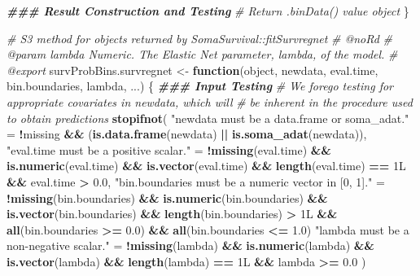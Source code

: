 \documentclass[
]{book}
\newenvironment{Shaded}{\begin{snugshade}}{\end{snugshade}}
\newcommand{\CommentTok}[1]{\textcolor[rgb]{0.56,0.35,0.01}{\textit{#1}}}
\newcommand{\ControlFlowTok}[1]{\textcolor[rgb]{0.13,0.29,0.53}{\textbf{#1}}}
\newcommand{\DocumentationTok}[1]{\textcolor[rgb]{0.56,0.35,0.01}{\textbf{\textit{#1}}}}
\newcommand{\FloatTok}[1]{\textcolor[rgb]{0.00,0.00,0.81}{#1}}
\newcommand{\FunctionTok}[1]{\textcolor[rgb]{0.13,0.29,0.53}{\textbf{#1}}}
\newcommand{\NormalTok}[1]{#1}
\newcommand{\OtherTok}[1]{\textcolor[rgb]{0.56,0.35,0.01}{#1}}
\newcommand{\SpecialCharTok}[1]{\textcolor[rgb]{0.81,0.36,0.00}{\textbf{#1}}}
\newcommand{\StringTok}[1]{\textcolor[rgb]{0.31,0.60,0.02}{#1}}
\begin{document}
\begin{Shaded}
\begin{Highlighting}[]
  \DocumentationTok{\#\#\# Result Construction and Testing}
  \CommentTok{\# Return \textasciigrave{}.binData()\textasciigrave{} value object}
\NormalTok{\}}

\CommentTok{\#\textquotesingle{} S3 method for objects returned by \textasciigrave{}SomaSurvival::fitSurvregnet\textasciigrave{}}
\CommentTok{\#\textquotesingle{} @noRd}
\CommentTok{\#\textquotesingle{} @param lambda Numeric. The Elastic Net parameter, lambda, of the model. }
\CommentTok{\#\textquotesingle{} @export}
\NormalTok{survProbBins.survregnet }\OtherTok{\textless{}{-}} \ControlFlowTok{function}\NormalTok{(object, newdata, eval.time, bin.boundaries,}
\NormalTok{                                    lambda, ...) \{}
  \DocumentationTok{\#\#\# Input Testing}
  \CommentTok{\# We forego testing for appropriate covariates in \textasciigrave{}newdata\textasciigrave{}, which will}
  \CommentTok{\#   be inherent in the procedure used to obtain predictions}
  \FunctionTok{stopifnot}\NormalTok{(}
    \StringTok{"\textasciigrave{}newdata\textasciigrave{} must be a data.frame or soma\_adat."} \OtherTok{=} 
      \SpecialCharTok{!}\NormalTok{missing }\SpecialCharTok{\&\&}\NormalTok{ (}\FunctionTok{is.data.frame}\NormalTok{(newdata) }\SpecialCharTok{||} \FunctionTok{is.soma\_adat}\NormalTok{(newdata)),}
    \StringTok{"\textasciigrave{}eval.time\textasciigrave{} must be a positive scalar."} \OtherTok{=} 
      \SpecialCharTok{!}\FunctionTok{missing}\NormalTok{(eval.time) }\SpecialCharTok{\&\&} \FunctionTok{is.numeric}\NormalTok{(eval.time) }\SpecialCharTok{\&\&} 
      \FunctionTok{is.vector}\NormalTok{(eval.time) }\SpecialCharTok{\&\&} \FunctionTok{length}\NormalTok{(eval.time) }\SpecialCharTok{==}\NormalTok{ 1L }\SpecialCharTok{\&\&}\NormalTok{ eval.time }\SpecialCharTok{\textgreater{}} \FloatTok{0.0}\NormalTok{,}
    \StringTok{"\textasciigrave{}bin.boundaries\textasciigrave{} must be a numeric vector in [0, 1]."} \OtherTok{=} 
      \SpecialCharTok{!}\FunctionTok{missing}\NormalTok{(bin.boundaries) }\SpecialCharTok{\&\&} \FunctionTok{is.numeric}\NormalTok{(bin.boundaries) }\SpecialCharTok{\&\&} 
      \FunctionTok{is.vector}\NormalTok{(bin.boundaries) }\SpecialCharTok{\&\&} \FunctionTok{length}\NormalTok{(bin.boundaries) }\SpecialCharTok{\textgreater{}}\NormalTok{ 1L }\SpecialCharTok{\&\&} 
      \FunctionTok{all}\NormalTok{(bin.boundaries }\SpecialCharTok{\textgreater{}=} \FloatTok{0.0}\NormalTok{) }\SpecialCharTok{\&\&} \FunctionTok{all}\NormalTok{(bin.boundaries }\SpecialCharTok{\textless{}=} \FloatTok{1.0}\NormalTok{)}
    \StringTok{"\textasciigrave{}lambda\textasciigrave{} must be a non{-}negative scalar."} \OtherTok{=} 
      \SpecialCharTok{!}\FunctionTok{missing}\NormalTok{(lambda) }\SpecialCharTok{\&\&} \FunctionTok{is.numeric}\NormalTok{(lambda) }\SpecialCharTok{\&\&} 
      \FunctionTok{is.vector}\NormalTok{(lambda) }\SpecialCharTok{\&\&} \FunctionTok{length}\NormalTok{(lambda) }\SpecialCharTok{==}\NormalTok{ 1L }\SpecialCharTok{\&\&}\NormalTok{ lambda }\SpecialCharTok{\textgreater{}=} \FloatTok{0.0}
\NormalTok{  )}
  

\end{Highlighting}
\end{Shaded}
\end{document}
